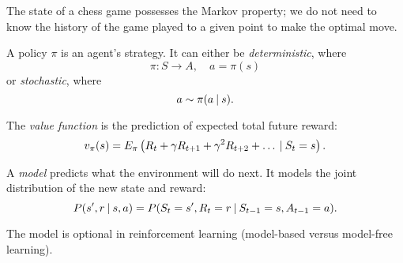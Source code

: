 \begin{example}[Chess]
	The state of a chess game possesses the Markov property;
	we do not need to know the history of the game played to a given point
	to make the optimal move.
\end{example}

\begin{definition}[Policy]
	A policy $\pi$ is an agent's strategy.
	It can either be \emph{deterministic}, where
	\[
		\pi: S \to A, \quad a = \pi(s)
	\]
	or \emph{stochastic}, where
	\[
		a \sim \pi(a \:\vert\: s).
	\]
\end{definition}

\begin{definition}
	The \emph{value function} is the prediction of expected total future reward:
	\[
		v_\pi(s) = E_\pi \left(
			R_t + \gamma R_{t+1} + \gamma^2 R_{t+2} + \ldots
			\:\vert\: S_t = s
		\right).
	\]
\end{definition}

\begin{definition}[Model]
	A \emph{model} predicts what the environment will do next.
	It models the joint distribution of the new state and reward:
	\[
		P(s', r \:\vert\: s, a)
		= P(S_t = s', R_t = r \:\vert\: S_{t-1} = s, A_{t-1} = a).
	\]
\end{definition}

The model is optional in reinforcement learning
(model-based versus model-free learning).
